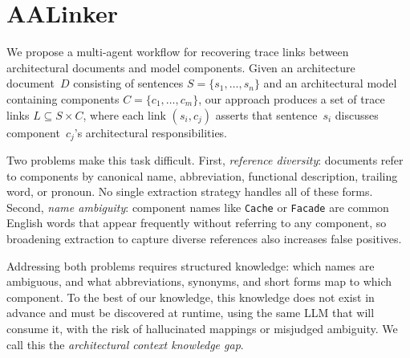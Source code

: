%

\section{AALinker}\label{sec:approach}

We propose a multi-agent workflow for recovering trace links between
architectural documents and model components.
Given an architecture document~$D$ consisting of sentences
$S = \{s_1, \ldots, s_n\}$ and an architectural model containing
components $C = \{c_1, \ldots, c_m\}$, our approach produces a set of
trace links $L \subseteq S \times C$, where each link $(s_i, c_j)$
asserts that sentence~$s_i$ discusses component~$c_j$'s architectural
responsibilities.

Two problems make this task difficult.
First, \emph{reference diversity}: documents refer to components by
canonical name, abbreviation, functional description, trailing word,
or pronoun.
No single extraction strategy handles all of these forms.
Second, \emph{name ambiguity}: component names like \texttt{Cache} or
\texttt{Facade} are common English words that appear frequently
without referring to any component, so broadening extraction to
capture diverse references also increases false positives.

Addressing both problems requires structured knowledge: which names
are ambiguous, and what abbreviations, synonyms, and short forms map
to which component.
To the best of our knowledge, this knowledge does not exist in advance
and must be discovered at runtime, using the same LLM that will
consume it, with the risk of hallucinated mappings or misjudged
ambiguity.
We call this the \emph{architectural context knowledge gap}.


